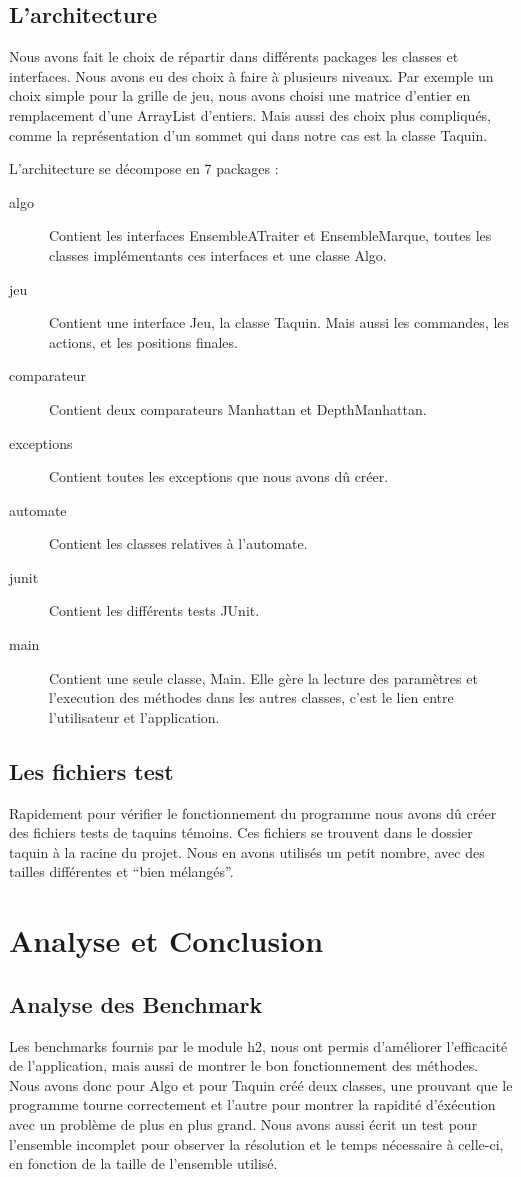 ﻿\documentclass[a4paper,twoside,12pt]{report}
\begin{document}
\section{L'architecture}
\par
Nous avons fait le choix de répartir dans différents packages les classes et 
interfaces. Nous avons eu des choix à faire à plusieurs niveaux. Par
exemple un choix simple pour la grille de jeu, nous avons choisi une matrice 
d'entier en remplacement d'une ArrayList d'entiers. Mais aussi des choix plus
compliqués, comme la représentation d'un sommet qui dans notre cas est la classe 
Taquin.
\par\noindent
L'architecture se décompose en 7 packages : 
\begin{description}
 \item [algo] Contient les interfaces EnsembleATraiter et EnsembleMarque, toutes 
les classes implémentants ces interfaces et une classe Algo.
 \item [jeu] Contient une interface Jeu, la classe Taquin. Mais aussi les 
commandes, les actions, et les positions finales.
 \item [comparateur] Contient deux comparateurs Manhattan et DepthManhattan.
 \item [exceptions] Contient toutes les exceptions que nous avons dû créer.
 \item [automate] Contient les classes relatives à l'automate.
 \item [junit] Contient les différents tests JUnit.
 \item [main] Contient une seule classe, Main. Elle gère la lecture des 
paramètres et l'execution des méthodes dans les autres classes, c'est
 le lien entre l'utilisateur et l'application.
\end{description}

\section{Les fichiers test}
\par
Rapidement pour vérifier le fonctionnement du programme nous avons dû créer des fichiers tests de taquins témoins. Ces fichiers se trouvent dans le dossier taquin
à la racine du projet. Nous en avons utilisés un petit nombre, avec des tailles différentes et ``bien mélangés''.
%
\chapter{Analyse et Conclusion}
%
\section{Analyse des Benchmark}
%
\par
Les benchmarks fournis par le module h2, nous ont permis d'améliorer l'efficacité de l'application, mais aussi de montrer le bon fonctionnement des méthodes.
Nous avons donc pour Algo et pour Taquin créé deux classes, une prouvant que le programme tourne correctement et l'autre pour montrer la rapidité d'éxécution
avec un problème de plus en plus grand. Nous avons aussi écrit un test pour l'ensemble incomplet pour observer la résolution et le temps nécessaire à celle-ci, en
fonction de la taille de l'ensemble utilisé.
%
\end{document}
